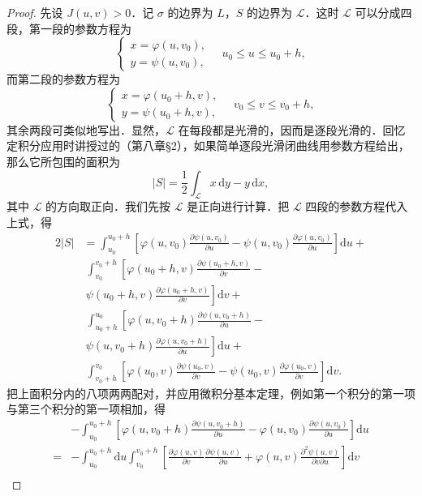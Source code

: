 \begin{proof}
先设 $J(u,v)>0$．记 $\sigma$ 的边界为 $L$，$S$ 的边界为 $\mathcal{L}$．这时 $\mathcal{L}$ 可以分成四段，第一段的参数方程为
\[
\begin{cases}
x=\varphi(u,v_{0}),\\
y=\psi(u,v_{0}),
\end{cases}
\quad u_{0}\leqslant u\leqslant u_{0}+h,
\]
而第二段的参数方程为
\[
\begin{cases}
x=\varphi(u_{0}+h,v),\\
y=\psi(u_{0}+h,v),
\end{cases}
\quad v_{0}\leqslant v\leqslant v_{0}+h,
\]
其余两段可类似地写出．显然，$\mathcal{L}$ 在每段都是光滑的，因而是逐段光滑的．回忆定积分应用时讲授过的（第八章§2），如果简单逐段光滑闭曲线用参数方程给出，那么它所包围的面积为
\[
\left|S\right|=\frac{1}{2}\int_{\mathcal{L}}x\,\mathrm{d}y-y\,\mathrm{d}x,
\]
其中 $\mathcal{L}$ 的方向取正向．我们先按 $\mathcal{L}$ 是正向进行计算．把 $\mathcal{L}$ 四段的参数方程代入上式，得
\[
\begin{aligned}
2\left|S\right|&=\int_{u_{0}}^{u_{0}+h}\left[\varphi(u,v_{0})\frac{\partial\psi(u,v_{0})}{\partial u}-\psi(u,v_{0})\frac{\partial\varphi(u,v_{0})}{\partial u}\right]\mathrm{d}u+\\
&\ \int_{v_{0}}^{v_{0}+h}\left[\varphi(u_{0}+h,v)\frac{\partial\psi(u_{0}+h,v)}{\partial v}-\right.\\
&\ \left.\psi(u_{0}+h,v)\frac{\partial\varphi(u_{0}+h,v)}{\partial v}\right]\mathrm{d}v+\\
&\ \int_{u_{0}+h}^{u_{0}}\left[\varphi(u,v_{0}+h)\frac{\partial\psi(u,v_{0}+h)}{\partial u}-\right.\\
&\ \left.\psi(u,v_{0}+h)\frac{\partial\varphi(u,v_{0}+h)}{\partial u}\right]\mathrm{d}u+\\
&\ \int_{v_{0}+h}^{v_{0}}\left[\varphi(u_{0},v)\frac{\partial\psi(u_{0},v)}{\partial v}-\psi(u_{0},v)\frac{\partial\varphi(u_{0},v)}{\partial v}\right]\mathrm{d}v.
\end{aligned}
\]
把上面积分内的八项两两配对，并应用微积分基本定理，例如第一个积分的第一项与第三个积分的第一项相加，得
\[
\begin{aligned}
&-\int_{u_{0}}^{u_{0}+h}\left[\varphi(u,v_{0}+h)\frac{\partial\psi(u,v_{0}+h)}{\partial u}-\varphi(u,v_{0})\frac{\partial\psi(u,v_{0})}{\partial u}\right]\mathrm{d}u\\
=&-\int_{u_{0}}^{u_{0}+h}\mathrm{d}u\int_{v_{0}}^{v_{0}+h}\left[\frac{\partial\varphi(u,v)}{\partial v}\frac{\partial\psi(u,v)}{\partial u}+\varphi(u,v)\frac{\partial^{2}\psi(u,v)}{\partial v\partial u}\right]\mathrm{d}v\\

\end{aligned}\]
\end{proof}
